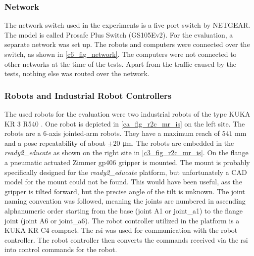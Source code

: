 \subsubsection{Network}\label{c6_sec_network}
The network switch used in the experiments is a five port switch by NETGEAR. The model is called Prosafe Plus Switch (GS105Ev2). For the evaluation, a separate network was set up. The robots and computers were connected over the switch, as shown in \autoref{c6_fig_network}. The computers were not connected to other networks at the time of the tests. Apart from the traffic caused by the tests, nothing else was routed over the network.



\subsubsection{Robots and Industrial Robot Controllers}\label{c3_sec_used_robots}
The used robots for the evaluation were two industrial robots of the type KUKA KR 3 R540 \cite{noauthor_agile_nodate, noauthor_kuka_kr_3_agiluspdf_nodate}. One robot is depicted in \autoref{ca_fig_r2c_mr_is} on the left site. The robots are a 6-axis jointed-arm robots. They have a maximum reach of $541$ \si{\milli\meter} and a pose repeatability of about $\pm 20$ \si{\micro\meter}. The robots are embedded in the \textit{ready2\_educate} as shown on the right site in \autoref{c3_fig_r2c_mr_is}. On the flange a pneumatic actuated Zimmer gp406 gripper is mounted. The mount is probably specifically designed for the \textit{ready2\_educate} platform, but unfortunately a CAD model for the mount could not be found. This would have been useful, ass the gripper is tilted forward, but the precise angle of the tilt is unknown. \newline
The joint naming convention was followed, meaning the joints are numbered in ascending alphanumeric order starting from the base (joint A1 or joint\_a1) to the flange joint (joint A6 or joint\_a6).\newline
The robot controller utilized in the platform is a KUKA KR C4 compact. The \acrfull{rsi}  was used for communication with the robot controller. The robot controller then converts the commands received via the \gls{rsi} into control commands for the robot.
